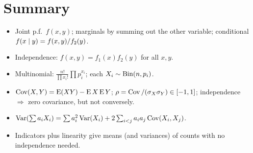 \section{Summary}

\begin{itemize}
  \item Joint p.f.\ $f(x,y)$; marginals by summing out the other variable; conditional
        $f(x\mid y) = f(x,y)/f_2(y)$.
  \item Independence: $f(x,y) = f_1(x)f_2(y)$ for all $x,y$.
  \item Multinomial: $\frac{n!}{\prod x_i!}\prod p_i^{x_i}$; each $X_i\sim\operatorname{Bin}(n,p_i)$.
  \item $\operatorname{Cov}(X,Y) = \operatorname{E}(XY) - \operatorname{E} X\operatorname{E} Y$; $\rho = \operatorname{Cov}/(\sigma_X\sigma_Y)\in[-1,1]$;
        independence $\Rightarrow$ zero covariance, but not conversely.
  \item $\operatorname{Var}(\sum a_iX_i) = \sum a_i^2\operatorname{Var}(X_i) + 2\sum_{i<j}a_ia_j\operatorname{Cov}(X_i,X_j)$.
  \item Indicators plus linearity give means (and variances) of counts with no
        independence needed.
\end{itemize}
